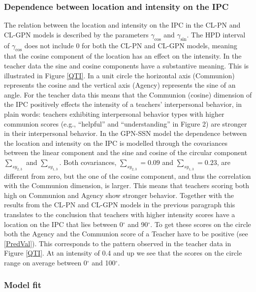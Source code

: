 \documentclass[man,mask]{apa6}
\begin{document}
\subsubsection{Dependence between location and intensity on the IPC}

The relation between the location and intensity on the IPC in the
CL-PN and CL-GPN models is described by the parameters \(\gamma_{\cos}\) and
\(\gamma_{\sin}\). The HPD interval of \(\gamma_{\cos}\) does not include 0 for
both the CL-PN and CL-GPN models, meaning that the cosine component of the location has an effect on the intensity.\newline
\indent In the teacher data the sine and cosine components have a substantive
meaning. This is illustrated in Figure \ref{QTI}. In a unit circle the
horizontal axis (Communion) represents the cosine and the vertical axis
(Agency) represents the sine of an angle. For the teacher data this means that
the Communion (cosine) dimension of the IPC positively effects the intensity of a
teachers' interpersonal behavior, in plain words: teachers exhibiting
interpersonal behavior types with higher communion scores (e.g., \enquote{helpful} and
\enquote{understanding} in Figure 2) are stronger in their interpersonal behavior.\newline 
\indent In the GPN-SSN model the dependence between the location and intensity on the IPC is modelled through the covariances between the linear
component and the sine and cosine of the circular component \(\sum_{sy_{2,3}}\) and
\(\sum_{sy_{1,3}}\). Both covariances, \(\sum_{sy_{2,3}} = 0.09\) and
\(\sum_{sy_{1,3}} = 0.23\), are different from zero, but the one of the cosine
component, and thus the correlation with the Communion dimension, is larger.
This means that teachers scoring both high on Communion and Agency show stronger
behavior. Together with the results from the CL-PN and CL-GPN models in the
previous paragraph this translates to the conclusion that teachers with higher
intensity scores have a location on the IPC that lies between
0\(^\circ\) and 90\(^\circ\). To get these scores on the circle both the Agency and
the Communion score of a Teacher have to be positive (see \eqref{PredVal}). This
corresponds to the pattern observed in the teacher data in Figure \ref{QTI}. At
an intensity of 0.4 and up we see that the scores on the circle range on average
between 0\(^\circ\) and 100\(^\circ\).

\subsubsection{Model fit}
\end{document}
